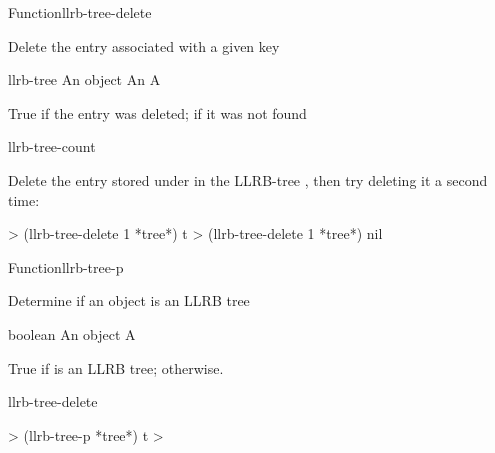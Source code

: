 \documentclass[10pt,twoside,english,pdftex]{article}
\begin{document}

\begin{functiondoc}{Function}{llrb-tree-delete}{%
    }
%

\fnsyntax

\fnpurpose Delete the entry associated with a given key

\fnpackage {}

\fnmodule {}

\fnargs
\begin{args}{llrb-tree}
\arg[key] An object
 An 
\arg[deleted-p] A 
\end{args}

\fnreturns True if the entry was deleted; \nil{} if it was not found

\begin{alsos}{llrb-tree-count}
\end{alsos}

\fnexample
%
Delete the entry stored under  in the LLRB-tree , then
try deleting it a second time:
\W\supp
\begin{example}
  > (llrb-tree-delete 1 *tree*)
  t
  > (llrb-tree-delete 1 *tree*)
  nil
\end{example}

\end{functiondoc}


\begin{functiondoc}{Function}{llrb-tree-p}{
    }
%

\fnsyntax

\fnpurpose Determine if an object is an LLRB tree

\fnpackage {}

\fnmodule {}

\fnargs
\begin{args}{boolean}
\arg[object] An object
\arg[boolean] A 
\end{args}

\fnreturns True if  is an LLRB tree; \nil{} otherwise.

\begin{alsos}{llrb-tree-delete}
\end{alsos}

\fnexample
%
\W\supp
\begin{example}
  > (llrb-tree-p *tree*)
  t
  >
\end{example}

\end{functiondoc}
\end{document}
